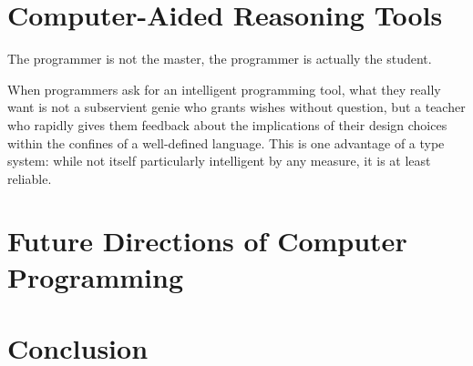 \documentclass[10pt]{article}
\begin{document}
  \section{Computer-Aided Reasoning Tools}

The programmer is not the master, the programmer is actually the student.

When programmers ask for an intelligent programming tool, what they really want is not a subservient genie who grants wishes without question, but a teacher who rapidly gives them feedback about the implications of their design choices within the confines of a well-defined language. This is one advantage of a type system: while not itself particularly intelligent by any measure, it is at least reliable.

  \section{Future Directions of Computer Programming}

  \section{Conclusion}

  
  
\end{document}
